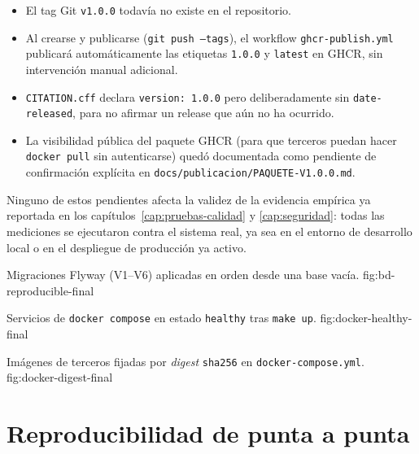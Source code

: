\begin{itemize}[nosep]
  \item El tag Git \texttt{v1.0.0} todav\'ia no existe en el repositorio.
  \item Al crearse y publicarse (\texttt{git push --tags}), el workflow
    \texttt{ghcr-publish.yml} publicar\'a autom\'aticamente las etiquetas
    \texttt{1.0.0} y \texttt{latest} en GHCR, sin intervenci\'on manual
    adicional.
  \item \texttt{CITATION.cff} declara \texttt{version: 1.0.0} pero
    deliberadamente sin \texttt{date-released}, para no afirmar un release
    que a\'un no ha ocurrido.
  \item La visibilidad p\'ublica del paquete GHCR (para que terceros puedan
    hacer \texttt{docker pull} sin autenticarse) qued\'o documentada como
    pendiente de confirmaci\'on expl\'icita en
    \texttt{docs/publicacion/PAQUETE-V1.0.0.md}.
\end{itemize}

Ninguno de estos pendientes afecta la validez de la evidencia emp\'irica ya
reportada en los cap\'itulos~\ref{cap:pruebas-calidad} y
\ref{cap:seguridad}: todas las mediciones se ejecutaron contra el sistema
real, ya sea en el entorno de desarrollo local o en el despliegue de
producci\'on ya activo.

%
{Migraciones Flyway (V1--V6) aplicadas en orden desde una base vac\'ia.}%
{fig:bd-reproducible-final}

%
{Servicios de \texttt{docker compose} en estado \texttt{healthy} tras \texttt{make up}.}%
{fig:docker-healthy-final}

%
{Im\'agenes de terceros fijadas por \emph{digest} \texttt{sha256} en \texttt{docker-compose.yml}.}%
{fig:docker-digest-final}

\section{Reproducibilidad de punta a punta}

